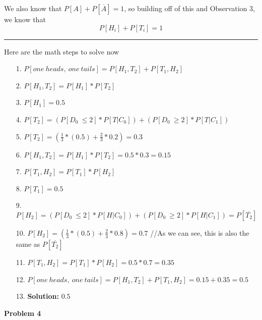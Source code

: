 \documentclass[11pt]{article}
\begin{document}
\begin{enumerate}
We also know that $P[A] + P[\overline{A}] = 1$, so building off of this and Observation 3, we know that
$$P[H_i] + P[T_i] = 1$$
\noindent\rule{20cm}{0.4pt}
Here are the math steps to solve now
\begin{enumerate}
\item[1. ] $P[one\ heads,\ one\ tails] = P[H_1,T_2] + P[T_1, H_2]$ \\
\item[2. ] $P[H_1, T_2] = P[H_1] * P[T_2]$\\
\item[3. ] $P[H_1] = 0.5$\\
\item[4. ] $P[T_2] = (P[D_0\ \leq 2] * P[T|C_0] ) + (P[D_0\ \geq 2] * P[T|C_1] )$\\
\item[5. ] $P[T_2] = (\frac{1}{3} * (0.5) + \frac{2}{3} * 0.2) = 0.3$\\
\item[6. ] $P[H_1, T_2] = P[H_1] * P[T_2] = 0.5 * 0.3 = 0.15$\\
\item[7. ] $P[T_1, H_2] = P[T_1] * P[H_2]$\\
\item[8. ] $P[T_1] = 0.5$\\
\item[9. ] $P[H_2] = (P[D_0\ \leq 2] * P[H|C_0] ) + (P[D_0\ \geq 2] * P[H|C_1] ) = P[\overline{T_2}]$\\
\item[10. ] $P[H_2] = (\frac{1}{3} * (0.5) + \frac{2}{3} * 0.8) = 0.7$ //As we can see, this is also the same as $P[\overline{T_2}]$\\
\item[11. ] $P[T_1, H_2] = P[T_1] * P[H_2] = 0.5 * 0.7 = 0.35$\\
\item[12. ] $P[one\ heads,\ one\ tails] = P[H_1,T_2] + P[T_1, H_2] = 0.15 + 0.35 = 0.5$\\
\item[13. ] \textbf{Solution: }$0.5$
\end{enumerate}
\newpage
\textbf{Problem 4}
\end{enumerate}
\end{document}
